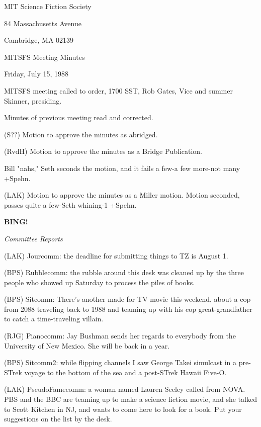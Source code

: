 \documentclass[12pt]{article}
\newcommand{\bing}{{\bf BING!} }
\newcommand{\goto}[1]{\bing \vskip 12pt \centerline{{\em{#1}}}}
\begin{document}
\begin{center}

MIT Science Fiction Society 

84 Massachusetts Avenue

Cambridge, MA 02139

\vspace{12pt}

MITSFS Meeting Minutes 

Friday, July 15, 1988

\end{center}
 
\vspace{18pt}

\setlength{\parskip}{6pt}

\noindent
MITSFS meeting called to order, 1700 SST,
Rob Gates, Vice and summer Skinner, presiding.

Minutes of previous meeting read and corrected.

(S??) Motion to approve the minutes as abridged.

(RvdH) Motion to approve the minutes as a Bridge Publication.

Bill "nahs," Seth seconds the motion, and it fails a few-a few more-not many +Spehn.

(LAK) Motion to approve the minutes as a Miller motion. Motion seconded, passes quite a few-Seth whining-1 +Spehn.

\goto{Committee Reports}

(LAK) Jourcomm: the deadline for submitting things to TZ is August 1.

(BPS) Rubblecomm: the rubble around this desk was cleaned up by the three people who showed up Saturday to process the piles of books.

(BPS) Sitcomm: There's another made for TV movie this weekend, about a cop from 2088 traveling  back to 1988 and teaming up with his cop great-grandfather to catch a time-traveling villain.

(RJG) Pianocomm: Jay Bushman sends her regards to everybody from the University of New Mexico. She will be back in a year.

(BPS) Sitcomm2: while flipping channels I saw George Takei simulcast in a pre-STrek voyage to the bottom of the sea and a post-STrek Hawaii Five-O.

(LAK) PseudoFamecomm: a woman named Lauren Seeley called from NOVA. PBS and the BBC are teaming up to make a science fiction movie, and she talked to Scott Kitchen in NJ, and wants to come here to look for a book. Put your suggestions on the list by the desk.
\end{document}
